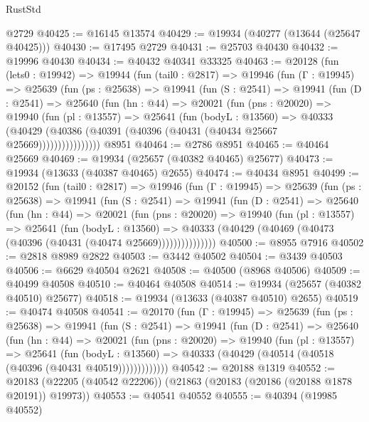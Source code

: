 \begin{lexlean}{RustStd}
\begin{coremodule}
    @2729
@40425 := @16145 @13574
@40429 := @19934 (@40277 (@13644 (@25647 @40425)))
@40430 := @17495 @2729
@40431 := @25703 @40430
@40432 := @19996 @40430
@40434 := @40432 @40341 @33325
@40463 := @20128
    (fun (lets0 : @19942) =>
    @19944
      (fun (tail0 : @2817) =>
      @19946
        (fun (Γ : @19945) =>
        @25639
          (fun (ps : @25638) =>
          @19941
            (fun (S : @2541) =>
            @19941
              (fun (D : @2541) =>
              @25640
                (fun (hn : @44) =>
                @20021
                  (fun (pns : @20020) =>
                  @19940
                    (fun (pl : @13557) =>
                    @25641
                      (fun (bodyL : @13560) =>
                      @40333
                        (@40429
                          (@40386 (@40391 (@40396 (@40431 (@40434 @25667 @25669))))))))))))))))
    @8951
@40464 := @2786 @8951
@40465 := @40464 @25669
@40469 := @19934 (@25657 (@40382 @40465) @25677)
@40473 := @19934 (@13633 (@40387 @40465) @2655)
@40474 := @40434 @8951
@40499 := @20152
    (fun (tail0 : @2817) =>
    @19946
      (fun (Γ : @19945) =>
      @25639
        (fun (ps : @25638) =>
        @19941
          (fun (S : @2541) =>
          @19941
            (fun (D : @2541) =>
            @25640
              (fun (hn : @44) =>
              @20021
                (fun (pns : @20020) =>
                @19940
                  (fun (pl : @13557) =>
                  @25641
                    (fun (bodyL : @13560) =>
                    @40333 (@40429 (@40469 (@40473 (@40396 (@40431 (@40474 @25669)))))))))))))))
@40500 := @8955 @7916
@40502 := @2818 @8989 @2822
@40503 := @3442 @40502
@40504 := @3439 @40503
@40506 := @6629 @40504 @2621
@40508 := @40500 (@8968 @40506)
@40509 := @40499 @40508
@40510 := @40464 @40508
@40514 := @19934 (@25657 (@40382 @40510) @25677)
@40518 := @19934 (@13633 (@40387 @40510) @2655)
@40519 := @40474 @40508
@40541 := @20170
    (fun (Γ : @19945) =>
    @25639
      (fun (ps : @25638) =>
      @19941
        (fun (S : @2541) =>
        @19941
          (fun (D : @2541) =>
          @25640
            (fun (hn : @44) =>
            @20021
              (fun (pns : @20020) =>
              @19940
                (fun (pl : @13557) =>
                @25641
                  (fun (bodyL : @13560) =>
                  @40333 (@40429 (@40514 (@40518 (@40396 (@40431 @40519)))))))))))))
@40542 := @20188 @1319
@40552 := @20183 (@22205 (@40542 @22206)) (@21863 (@20183 (@20186 (@20188 @1878 @20191)) @19973))
@40553 := @40541 @40552
@40555 := @40394 (@19985 @40552)

\end{coremodule}
\end{lexlean}
